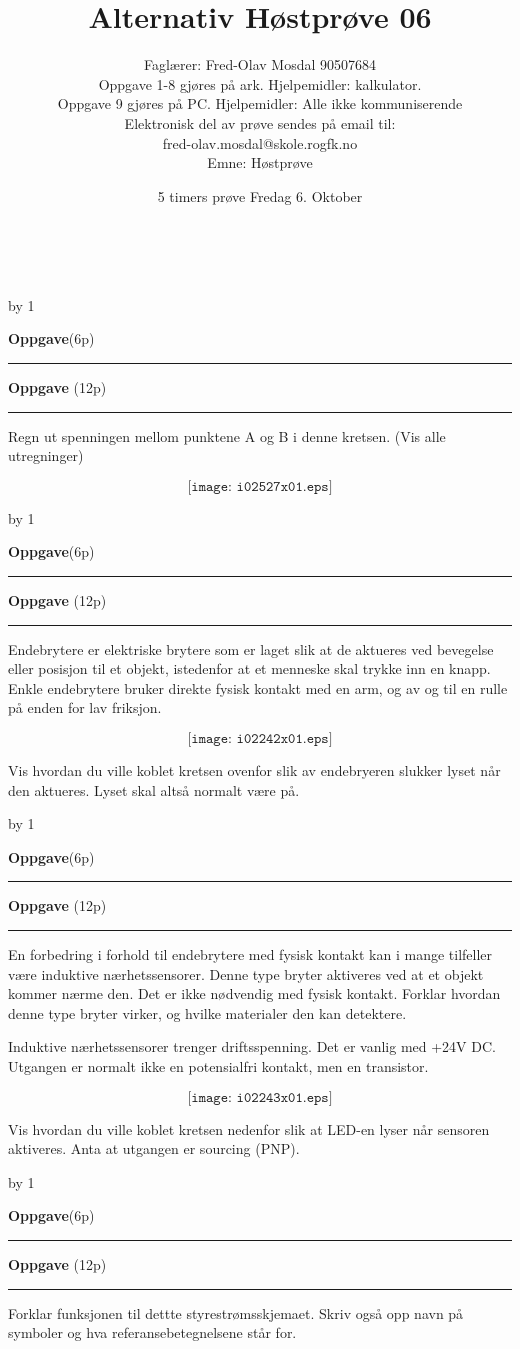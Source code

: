 \documentclass[12pt,a4paper]{article}
\def\oppgave{
            \advance\questnum by 1
	    \ifthenelse{\questnum>0\AND \questnum<9}
	    {
                \vskip 1cm
		\textbf{Oppgave}\hskip 5pt\the\questnum \hfill \hfill(6p)
		\vskip 3pt
		\hrule
	\vskip 0.5cm}
	{
                \vskip 1cm
		\textbf{Oppgave}\hskip 5pt \the\questnum \hfill \hfill(12p)
		\vskip 3pt \hrule \vskip 0.5cm }

		}
\begin{document}
\title{Alternativ Høstprøve 06}
\author{Faglærer: Fred-Olav Mosdal 90507684\\
Oppgave 1-8 gjøres på ark. Hjelpemidler: kalkulator. \\
Oppgave 9 gjøres på PC. Hjelpemidler: Alle ikke kommuniserende\\
Elektronisk del av prøve sendes på email til: \\
fred-olav.mosdal@skole.rogfk.no\\
Emne: Høstprøve}
\date{5 timers prøve Fredag 6. Oktober}
\maketitle
\newpage
\
\newpage
\oppgave{}
Regn ut spenningen mellom punktene A og B i denne kretsen. (Vis alle utregninger)

$$\texttt{[image: i02527x01.eps]}$$

\newpage
\oppgave{}
Endebrytere er elektriske brytere som er laget slik at de aktueres ved bevegelse eller posisjon til et objekt, istedenfor at et menneske skal trykke inn en knapp. Enkle endebrytere bruker direkte fysisk kontakt med en arm, og av og til en rulle på enden for lav friksjon. 

$$\texttt{[image: i02242x01.eps]}$$

\vskip 30pt

Vis hvordan du ville koblet kretsen ovenfor slik av endebryeren slukker lyset når den aktueres. Lyset skal altså normalt være på. 
\oppgave{}
En forbedring i forhold til endebrytere med fysisk kontakt kan i mange tilfeller være induktive nærhetssensorer. Denne type bryter aktiveres ved at et objekt kommer nærme den. Det er ikke nødvendig med fysisk kontakt. Forklar hvordan denne type bryter virker, og hvilke materialer den kan detektere. 

Induktive nærhetssensorer trenger driftsspenning. Det er vanlig med +24V DC. Utgangen er normalt ikke en potensialfri kontakt, men en transistor. 

$$\texttt{[image: i02243x01.eps]}$$

\vskip 30pt

Vis hvordan du ville koblet kretsen nedenfor slik at LED-en lyser når sensoren aktiveres. Anta at utgangen er sourcing (PNP).
\newpage
\oppgave{}
Forklar funksjonen til dettte styrestrømsskjemaet. Skriv også opp navn på symboler og hva referansebetegnelsene står for. 
\end{document}
